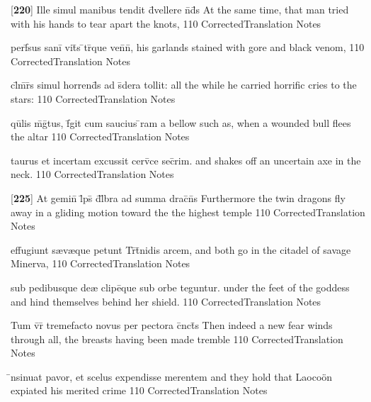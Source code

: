 \latline
  {[\textbf{220}] Ille simul manibus tendit d\={\macron {\i}}vellere n\={}d\={}s}
  { At the same time, that man tried with his hands to tear apart the knots, }
  {110}
  { CorrectedTranslation }
  { Notes }


\latline
  {perf\={}sus sani\={} vit\={}s \={}tr\={}que ven\={}n\={},}
  { his garlands stained with gore and black venom, }
  {110}
  { CorrectedTranslation }
  { Notes }


\latline
  {cl\={}m\={}r\={}s simul horrend\={}s ad s\={\macron {\i}}dera tollit:}
  { all the while he carried horrific cries to the stars: }
  {110}
  { CorrectedTranslation }
  { Notes }


\latline
  {qu\={}lis m\={}g\={\macron {\i}}tus, f\={}git cum saucius \={}ram}
  { a bellow such as, when a wounded bull flees the altar }
  {110}
  { CorrectedTranslation }
  { Notes }


\latline
  {taurus et incertam excussit cerv\={\macron {\i}}ce sec\={}rim.}
  { and shakes off an uncertain axe in the neck.  }
  {110}
  { CorrectedTranslation }
  { Notes }


\latline
  {[\textbf{225}] At gemin\={\macron {\i}} l\={}ps\={} d\={}l\={}bra ad summa drac\={}n\={}s}
  { Furthermore the twin dragons fly away in a gliding motion toward the the highest temple }
  {110}
  { CorrectedTranslation }
  { Notes }


\latline
  {effugiunt s{\ae}v{\ae}que petunt Tr\={\macron {\i}}t\={}nidis arcem,}
  { and both go in the citadel of savage Minerva, }
  {110}
  { CorrectedTranslation }
  { Notes }


\latline
  {sub pedibusque de{\ae} clipe\={\macron {\i}}que sub orbe teguntur.}
  { under the feet of the goddess and hind themselves behind her shield. }
  {110}
  { CorrectedTranslation }
  { Notes }


\latline
  {Tum v\={}r\={} tremefacto novus per pectora c\={}nct\={\macron {\i}}s}
  { Then indeed a new fear winds through all, the breasts having been made tremble }
  {110}
  { CorrectedTranslation }
  { Notes }


\latline
  {\={\macron {\i}}nsinuat pavor, et scelus expendisse merentem}
  { and they hold that Laoco\"on expiated his merited crime  }
  {110}
  { CorrectedTranslation }
  { Notes }


